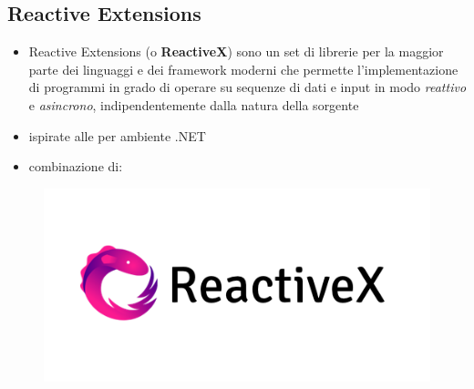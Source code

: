         \subsection{Reactive Extensions}\label{subsec:rx}
        \begin{frame}{\insertsectionhead}
            \begin{block}{\insertsubsectionhead}
                \begin{itemize}
                    \item
                        Reactive Extensions (o \textbf{ReactiveX}) sono un set di librerie per la maggior parte dei linguaggi e dei framework moderni che permette l'implementazione di programmi in grado di operare su sequenze di dati e input in modo \textit{reattivo} e \textit{asincrono}, indipendentemente dalla natura della sorgente
                    \item
                        ispirate alle  per ambiente .NET
                    \item
                        combinazione di:
                \end{itemize}
            \end{block}
            \begin{figure}[htbp]
                \centering
                \includegraphics[scale=.35]{Rx_Logo_Text}
                \label{fig:rx}
            \end{figure}
        \end{frame}

